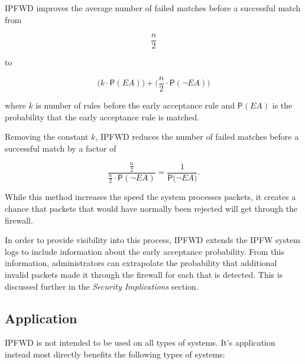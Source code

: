 \documentclass[journal]{IEEEtran}
\begin{document}
  IPFWD improves the average number of failed matches before a successful match
  from

  \[
  \frac{n}{2}
  \]

  to

  \[
  \Big(k \cdot \mathsf{P}(\textit{EA})\Big) + 
  \Big(\frac{n}{2} \cdot \mathsf{P}(\neg{\textit{EA}})\Big) 
  \]

  where $k$ is number of rules before the early acceptance rule and
  $\mathsf{P}(\textit{EA})$ is the probability that the early acceptance rule
  is matched.

  Removing the constant $k$, IPFWD reduces the number of failed matches before
  a successful match by a factor of

  \[
  \frac
      {\frac{n}{2}}
      {\frac{n}{2} \cdot \mathsf{P}(\neg{\textit{EA}})} 
  = \frac{1}{\mathsf{P}(\neg{\textit{EA})}}.
  \]

  While this method increases the speed the system processes packets, it
  creates a chance that packets that would have normally been rejected will get
  through the firewall.

  In order to provide visibility into this process, IPFWD extends the IPFW
  system logs to include information about the early acceptance probability.
  From this information, administrators can extrapolate the probability that
  additional invalid packets made it through the firewall for each that is
  detected. This is discussed further in the \textit{Security Implications}
  section.

  \subsection{Application}

    IPFWD is not intended to be used on all types of systems. It's application
    instead most directly benefits the following types of systems:
\end{document}
